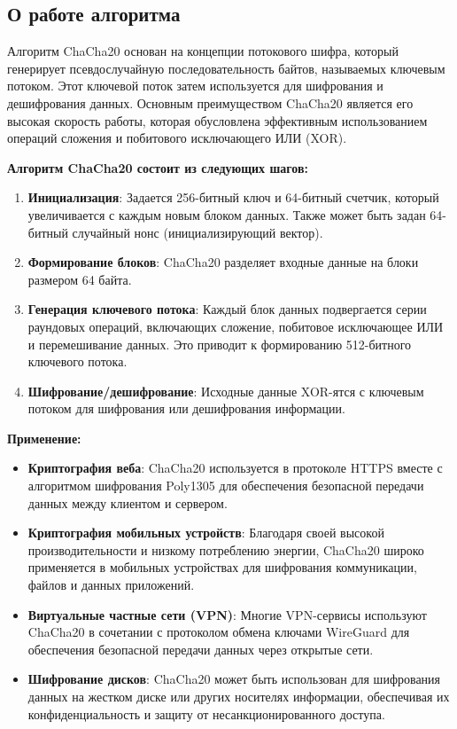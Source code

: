 \documentclass[12pt]{article}
\begin{document}
    \subsection{О работе алгоритма}
    Алгоритм ChaCha20 основан на концепции потокового шифра, который генерирует псевдослучайную последовательность байтов, называемых ключевым потоком.
    Этот ключевой поток затем используется для шифрования и дешифрования данных.
    Основным преимуществом ChaCha20 является его высокая скорость работы, которая обусловлена эффективным использованием операций сложения и побитового исключающего ИЛИ (XOR).

    \textbf{Алгоритм ChaCha20 состоит из следующих шагов:}

    \begin{enumerate}
        \item \textbf{Инициализация}: Задается 256-битный ключ и 64-битный счетчик, который увеличивается с каждым новым блоком данных.
        Также может быть задан 64-битный случайный нонс (инициализирующий вектор).
        \item \textbf{Формирование блоков}: ChaCha20 разделяет входные данные на блоки размером 64 байта.
        \item \textbf{Генерация ключевого потока}: Каждый блок данных подвергается серии раундовых операций, включающих сложение, побитовое исключающее ИЛИ и перемешивание данных.
        Это приводит к формированию 512-битного ключевого потока.
        \item \textbf{Шифрование/дешифрование}: Исходные данные XOR-ятся с ключевым потоком для шифрования или дешифрования информации.
    \end{enumerate}

    \textbf{Применение:}

    \begin{itemize}
        \item \textbf{Криптография веба}: ChaCha20 используется в протоколе HTTPS вместе с алгоритмом шифрования Poly1305 для обеспечения безопасной передачи данных между клиентом и сервером.
        \item \textbf{Криптография мобильных устройств}: Благодаря своей высокой производительности и низкому потреблению энергии, ChaCha20 широко применяется в мобильных устройствах для шифрования коммуникации, файлов и данных приложений.
        \item \textbf{Виртуальные частные сети (VPN)}: Многие VPN-сервисы используют ChaCha20 в сочетании с протоколом обмена ключами WireGuard для обеспечения безопасной передачи данных через открытые сети.
        \item \textbf{Шифрование дисков}: ChaCha20 может быть использован для шифрования данных на жестком диске или других носителях информации, обеспечивая их конфиденциальность и защиту от несанкционированного доступа.
    \end{itemize}
\end{document}
